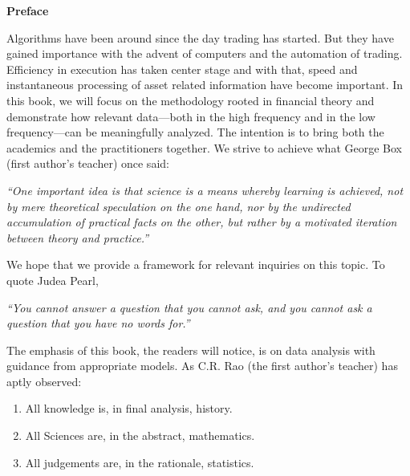 \begin{center} {\large\bfseries Preface} \end{center}


Algorithms have been around since the day trading has started. But they have gained importance with the advent of computers and the automation of trading. Efficiency in execution has taken center stage and with that, speed and instantaneous processing of asset related information have become important. In this book, we will focus on the methodology rooted in financial theory and demonstrate how relevant data---both in the high frequency and in the low frequency---can be meaningfully analyzed. The intention is to bring both the academics and the practitioners together. We strive to achieve what George Box (first author's teacher) once said: \par
        \begin{center}
        \begin{minipage}[t]{0.7\textwidth}
        	\raggedright
          	{\itshape``One important idea is that science is a means whereby learning is achieved, not by mere theoretical speculation on the one hand, nor by the undirected accumulation of practical facts on the other, but rather by a motivated iteration between theory and practice.''}
        \end{minipage} 
        \end{center}

We hope that we provide a framework for relevant inquiries on this topic. To quote Judea Pearl, \par
        \begin{center}
        \begin{minipage}[t]{0.7\textwidth}
        	\raggedright
          	{\itshape``You cannot answer a question that you cannot ask, and you cannot ask a question that you have no words for.''}
        \end{minipage} 
        \end{center}
The emphasis of this book, the readers will notice, is on data analysis with guidance from appropriate models. As C.R. Rao (the first author's teacher) has aptly observed:
	\begin{enumerate}
	\item[] All knowledge is, in final analysis, history.
	\item[] All Sciences are, in the abstract, mathematics.
	\item[] All judgements are, in the rationale, statistics.
	\end{enumerate}


